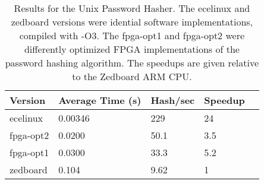 \begin{table}[h]
\begin{tabular}{@{}lllll@{}}
\toprule
  Version   & Average Time (s) & Hash/sec & Speedup \\ \midrule
  ecelinux  & 0.00346          & 229      & 24      \\
  fpga-opt2 & 0.0200           & 50.1     & 3.5     \\
  fpga-opt1 & 0.0300           & 33.3     & 5.2     \\
  zedboard  & 0.104            & 9.62     & 1       \\ \bottomrule
\end{tabular}
\caption {Results for the Unix Password Hasher. The ecelinux and zedboard versions were idential software
  implementations, compiled with -O3. The fpga-opt1 and fpga-opt2 were differently optimized FPGA
  implementations of the password hashing algorithm. The speedups are given relative to the Zedboard ARM
  CPU.}
\label{table:hashresults}
\end{table}

